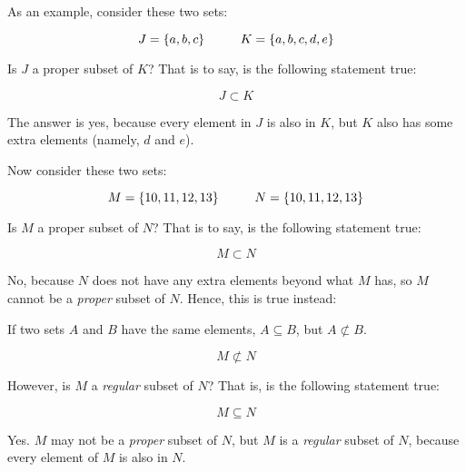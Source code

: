 \documentclass[../../../main.tex]{subfiles}
\begin{document}
As an example, consider these two sets:

\begin{equation*}
  J = \{ a, b, c \} \hskip 1cm K = \{ a, b, c, d, e \}
\end{equation*}

Is $J$ a proper subset of $K$? That is to say, is the following statement true:

\begin{equation*}
  J \subset K
\end{equation*}

The answer is yes, because every element in $J$ is also in $K$, but $K$ also has some extra elements (namely, $d$ and $e$).

Now consider these two sets:

\begin{equation*}
  M = \{ 10, 11, 12, 13 \} \hskip 1cm N = \{ 10, 11, 12, 13 \}
\end{equation*}

Is $M$ a proper subset of $N$? That is to say, is the following statement true:

\begin{equation*}
  M \subset N
\end{equation*}

No, because $N$ does not have any extra elements beyond what $M$ has, so $M$ cannot be a \emph{proper} subset of $N$. Hence, this is true instead:

\begin{aside}
  \begin{remark}
    If two sets $A$ and $B$ have the same elements, $A \subseteq B$, but $A \not \subset B$.
  \end{remark}
\end{aside}

\begin{equation*}
  M \not \subset N
\end{equation*}

However, is $M$ a \emph{regular} subset of $N$? That is, is the following statement true: 

\begin{equation*}
  M \subseteq N
\end{equation*}

Yes. $M$ may not be a \emph{proper} subset of $N$, but $M$ is a \emph{regular} subset of $N$, because every element of $M$ is also in $N$.


\end{document}
